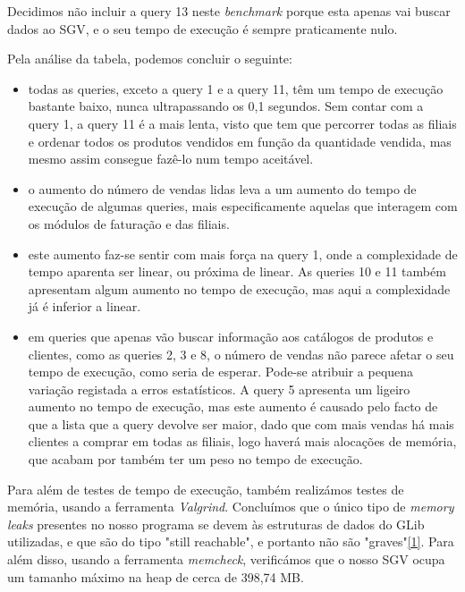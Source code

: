 \documentclass[a4paper]{report}
\begin{document}
	Decidimos não incluir a query 13 neste \textit{benchmark} porque esta apenas vai buscar dados ao SGV,
	e o seu tempo de execução é sempre praticamente nulo.

	Pela análise da tabela, podemos concluir o seguinte:
	\begin{itemize}

		\item todas as queries, exceto a query 1 e a query 11, têm um tempo de execução bastante baixo, 
		nunca ultrapassando os 0,1 segundos. Sem contar com a query 1, a query 11 é a mais lenta, visto
		que tem que percorrer todas as filiais e ordenar todos os produtos vendidos em função da quantidade
		vendida, mas mesmo assim consegue fazê-lo num tempo aceitável.

		\item o aumento do número de vendas lidas leva a um aumento do tempo de execução de algumas queries,
		mais especificamente aquelas que interagem com os módulos de faturação e das filiais.

		\item este aumento faz-se sentir com mais força na query 1, onde a complexidade de tempo aparenta
		ser linear, ou próxima de linear. As queries 10 e 11 também apresentam algum aumento no tempo
		de execução, mas aqui a complexidade já é inferior a linear.

		\item em queries que apenas vão buscar informação aos catálogos de produtos e clientes, como as
		queries 2, 3 e 8, o número de vendas não parece afetar o seu tempo de execução, como seria de esperar.
		Pode-se atribuir a pequena variação registada a erros estatísticos.
		A query 5 apresenta um ligeiro aumento no tempo de execução, mas este aumento é causado pelo facto
		de que a lista que a query devolve ser maior, dado que com mais vendas há mais clientes a comprar 
		em todas as filiais, logo haverá mais alocações de memória, que acabam por também ter um peso
		no tempo de execução.
		
	\end{itemize}

	Para além de testes de tempo de execução, também realizámos testes de memória, usando a ferramenta
	\emph{Valgrind}. Concluímos que o único tipo de \textit{memory leaks} presentes no nosso programa
	se devem às estruturas de dados do GLib utilizadas, e que são do tipo "still reachable", e portanto
	não são "graves"\href{https://valgrind.org/docs/manual/faq.html#faq.deflost}{[1]}. Para além disso,
	usando a ferramenta \emph{memcheck}, verificámos que o nosso SGV ocupa um tamanho máximo na heap 
	de cerca de	398,74 MB.
\end{document}
